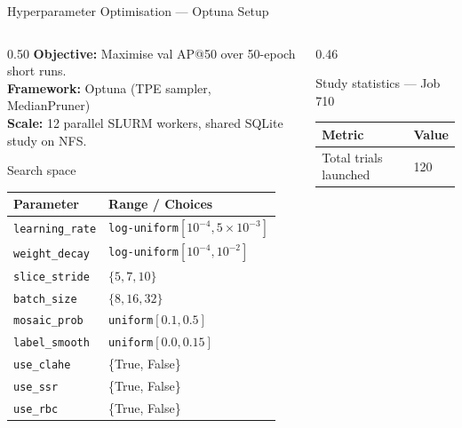 \documentclass[aspectratio=169, 10pt]{beamer}
\begin{document}
\begin{frame}{Hyperparameter Optimisation — Optuna Setup}
  \begin{columns}[T]
    \begin{column}{0.50\textwidth}
      \textbf{Objective:} Maximise val AP@50 over 50-epoch short runs.\\[4pt]
      \textbf{Framework:} Optuna (TPE sampler, MedianPruner)\\
      \textbf{Scale:} 12 parallel SLURM workers, shared SQLite study on NFS.

      \vspace{6pt}
      \begin{block}{\small Search space}
        \small
        \begin{tabular}{ll}
          \toprule
          Parameter & Range / Choices \\
          \midrule
          \texttt{learning\_rate}   & \texttt{log-uniform}$[10^{-4},5{\times}10^{-3}]$ \\
          \texttt{weight\_decay}    & \texttt{log-uniform}$[10^{-4},10^{-2}]$ \\
          \texttt{slice\_stride}    & $\{5, 7, 10\}$ \\
          \texttt{batch\_size}      & $\{8, 16, 32\}$ \\
          \texttt{mosaic\_prob}     & \texttt{uniform}$[0.1, 0.5]$ \\
          \texttt{label\_smooth}    & \texttt{uniform}$[0.0, 0.15]$ \\
          \texttt{use\_clahe}       & \{True, False\} \\
          \texttt{use\_ssr}         & \{True, False\} \\
          \texttt{use\_rbc}         & \{True, False\} \\
          \bottomrule
        \end{tabular}
      \end{block}
    \end{column}
    \begin{column}{0.46\textwidth}
      \vspace{2pt}
      \begin{block}{\small Study statistics — Job 710}
        \small
        \begin{tabular}{ll}
          \toprule
          Metric & Value \\
          \midrule
          Total trials launched & 120 \\

\end{tabular}
\end{block}
\end{column}
\end{columns}
\end{frame}
\end{document}

